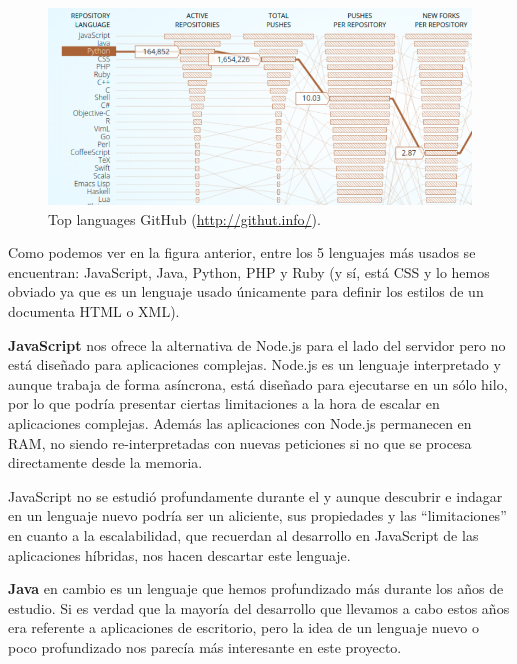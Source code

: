 \begin{figure}[!ht]
  \begin{center}
  \includegraphics[width=1\textwidth]{../images/trend_lang_github_16-17.png}
  \caption[Top languages GitHub]{Top languages GitHub (\href{http://githut.info/}{http://githut.info/}).}
  \label{fig:trending_languages_github_16-17}
  \end{center}
\end{figure}

\bigskip
Como podemos ver en la figura anterior, entre los 5 lenguajes más usados se encuentran: JavaScript, Java, Python, PHP y Ruby (y sí, está CSS y lo hemos obviado ya que es un lenguaje usado únicamente para definir los estilos de un documenta HTML o XML). 

\bigskip
\textbf{JavaScript} nos ofrece la alternativa de Node.js para el lado del servidor pero no está diseñado para aplicaciones complejas. Node.js es un lenguaje interpretado y aunque trabaja de forma asíncrona, está diseñado para ejecutarse en un sólo hilo, por lo que podría presentar ciertas limitaciones a la hora de escalar en aplicaciones complejas. Además las aplicaciones con Node.js permanecen en RAM, no siendo re-interpretadas con nuevas peticiones si no que se procesa directamente desde la memoria.

\bigskip
JavaScript no se estudió profundamente durante el {\grado} y aunque descubrir e indagar en un lenguaje nuevo podría ser un aliciente, sus propiedades y las ``limitaciones'' en cuanto a la escalabilidad, que recuerdan al desarrollo en JavaScript de las aplicaciones híbridas, nos hacen descartar este lenguaje.

\bigskip
\textbf{Java} en cambio es un lenguaje que hemos profundizado más durante los años de estudio. Si es verdad que la mayoría del desarrollo que llevamos a cabo estos años era referente a aplicaciones de escritorio, pero la idea de un lenguaje nuevo o poco profundizado nos parecía más interesante en este proyecto.


